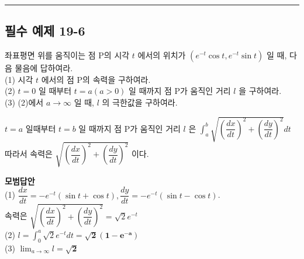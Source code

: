 \documentclass[a4paper,11pt]{article}
\begin{document}
\vspace{0.5cm}
\hrule
\vspace{0.5cm}

\subsection*{필수 예제 19-6}
좌표평면 위를 움직이는 점 P의 시각 $t$ 에서의 위치가 $(e^{-t} \cos t, e^{-t} \sin t)$ 일 때, 다음 물음에 답하여라.\\
(1) 시각 $t$ 에서의 점 P의 속력을 구하여라.\\
(2) $t=0$ 일 때부터 $t=a(a > 0)$ 일 때까지 점 P가 움직인 거리 $l$ 을 구하여라.\\
(3) (2)에서 $a \to \infty$ 일 때, $l$ 의 극한값을 구하여라.

\begin{studybox}
  $t=a$ 일때부터 $t=b$ 일 때까지 점 P가 움직인 거리 $l$ 은 $\int_{a}^{b} \sqrt{(\dfrac{dx}{dt})^2 + (\dfrac{dy}{dt})^2} dt$ 
  따라서 속력은 $\sqrt{(\dfrac{dx}{dt})^2 + (\dfrac{dy}{dt})^2}$ 이다.
\end{studybox}

\textbf{모범답안} \\
(1) $\dfrac{dx}{dt} = -e^{-t}(\sin t + \cos t), \dfrac{dy}{dt} = -e^{-t}(\sin t - \cos t)$.\\
 속력은 $\sqrt{(\dfrac{dx}{dt})^2 + (\dfrac{dy}{dt})^2}= \sqrt{2}e^{-t}$ \\
(2) $l = \int_{0}^{a} \sqrt{2}e^{-t} dt = \mathbf{\sqrt{2}(1 - e^{-a})}$ \\
(3) $\lim_{a \to \infty} l = \mathbf{\sqrt{2}}$
\end{document}
